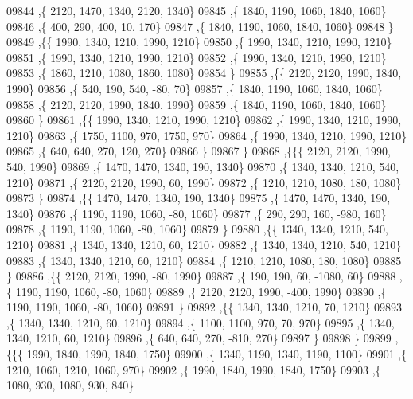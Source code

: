 \begin{DoxyCode}
09844     ,\{  2120,  1470,  1340,  2120,  1340\}
09845     ,\{  1840,  1190,  1060,  1840,  1060\}
09846     ,\{   400,   290,   400,    10,   170\}
09847     ,\{  1840,  1190,  1060,  1840,  1060\}
09848     \}
09849    ,\{\{  1990,  1340,  1210,  1990,  1210\}
09850     ,\{  1990,  1340,  1210,  1990,  1210\}
09851     ,\{  1990,  1340,  1210,  1990,  1210\}
09852     ,\{  1990,  1340,  1210,  1990,  1210\}
09853     ,\{  1860,  1210,  1080,  1860,  1080\}
09854     \}
09855    ,\{\{  2120,  2120,  1990,  1840,  1990\}
09856     ,\{   540,   190,   540,   -80,    70\}
09857     ,\{  1840,  1190,  1060,  1840,  1060\}
09858     ,\{  2120,  2120,  1990,  1840,  1990\}
09859     ,\{  1840,  1190,  1060,  1840,  1060\}
09860     \}
09861    ,\{\{  1990,  1340,  1210,  1990,  1210\}
09862     ,\{  1990,  1340,  1210,  1990,  1210\}
09863     ,\{  1750,  1100,   970,  1750,   970\}
09864     ,\{  1990,  1340,  1210,  1990,  1210\}
09865     ,\{   640,   640,   270,   120,   270\}
09866     \}
09867    \}
09868   ,\{\{\{  2120,  2120,  1990,   540,  1990\}
09869     ,\{  1470,  1470,  1340,   190,  1340\}
09870     ,\{  1340,  1340,  1210,   540,  1210\}
09871     ,\{  2120,  2120,  1990,    60,  1990\}
09872     ,\{  1210,  1210,  1080,   180,  1080\}
09873     \}
09874    ,\{\{  1470,  1470,  1340,   190,  1340\}
09875     ,\{  1470,  1470,  1340,   190,  1340\}
09876     ,\{  1190,  1190,  1060,   -80,  1060\}
09877     ,\{   290,   290,   160,  -980,   160\}
09878     ,\{  1190,  1190,  1060,   -80,  1060\}
09879     \}
09880    ,\{\{  1340,  1340,  1210,   540,  1210\}
09881     ,\{  1340,  1340,  1210,    60,  1210\}
09882     ,\{  1340,  1340,  1210,   540,  1210\}
09883     ,\{  1340,  1340,  1210,    60,  1210\}
09884     ,\{  1210,  1210,  1080,   180,  1080\}
09885     \}
09886    ,\{\{  2120,  2120,  1990,   -80,  1990\}
09887     ,\{   190,   190,    60, -1080,    60\}
09888     ,\{  1190,  1190,  1060,   -80,  1060\}
09889     ,\{  2120,  2120,  1990,  -400,  1990\}
09890     ,\{  1190,  1190,  1060,   -80,  1060\}
09891     \}
09892    ,\{\{  1340,  1340,  1210,    70,  1210\}
09893     ,\{  1340,  1340,  1210,    60,  1210\}
09894     ,\{  1100,  1100,   970,    70,   970\}
09895     ,\{  1340,  1340,  1210,    60,  1210\}
09896     ,\{   640,   640,   270,  -810,   270\}
09897     \}
09898    \}
09899   ,\{\{\{  1990,  1840,  1990,  1840,  1750\}
09900     ,\{  1340,  1190,  1340,  1190,  1100\}
09901     ,\{  1210,  1060,  1210,  1060,   970\}
09902     ,\{  1990,  1840,  1990,  1840,  1750\}
09903     ,\{  1080,   930,  1080,   930,   840\}

\end{DoxyCode}
